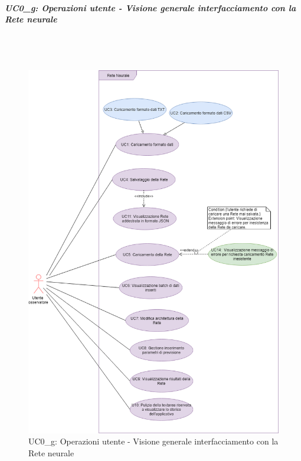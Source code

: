       
\subparagraph{UC0\_g: Operazioni utente - Visione generale interfacciamento con la Rete neurale}\mbox{}\\\\
\label{UC0_g: Operazioni utente - Visione generale interfacciamento con la Rete neurale}
\noindent
\begin{figure}[H]
\centering
	\includegraphics[width=1\linewidth]{./image/uc0_g.png}
	\caption{UC0\_g: Operazioni utente - Visione generale interfacciamento con la Rete neurale}
	\label{UC0_g: Operazioni utente - Visione generale interfacciamento con la Rete neurale}
\end{figure}
\noindent

